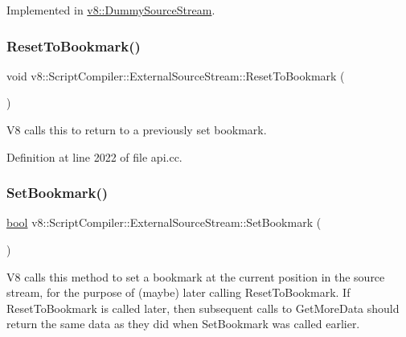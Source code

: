 Implemented in \mbox{\hyperlink{classv8_1_1DummySourceStream_a0b4b9e3f0d0747d169ba75e68fe596d7}{v8\+::\+Dummy\+Source\+Stream}}.

\mbox{\label{classv8_1_1ScriptCompiler_1_1ExternalSourceStream_af950fd00676e6bdb8642791f651b161a}} 
\subsubsection{\texorpdfstring{Reset\+To\+Bookmark()}{ResetToBookmark()}}
{\footnotesize\ttfamily void v8\+::\+Script\+Compiler\+::\+External\+Source\+Stream\+::\+Reset\+To\+Bookmark (\begin{DoxyParamCaption}{ }\end{DoxyParamCaption})\hspace{0.3cm}{\ttfamily [virtual]}}

V8 calls this to return to a previously set bookmark. 

Definition at line 2022 of file api.\+cc.

\mbox{\label{classv8_1_1ScriptCompiler_1_1ExternalSourceStream_a0012cebde92a3a61ec033e3abc2dd2ee}} 
\subsubsection{\texorpdfstring{Set\+Bookmark()}{SetBookmark()}}
{\footnotesize\ttfamily \mbox{\hyperlink{classbool}{bool}} v8\+::\+Script\+Compiler\+::\+External\+Source\+Stream\+::\+Set\+Bookmark (\begin{DoxyParamCaption}{ }\end{DoxyParamCaption})\hspace{0.3cm}{\ttfamily [virtual]}}

V8 calls this method to set a \textquotesingle{}bookmark\textquotesingle{} at the current position in the source stream, for the purpose of (maybe) later calling Reset\+To\+Bookmark. If Reset\+To\+Bookmark is called later, then subsequent calls to Get\+More\+Data should return the same data as they did when Set\+Bookmark was called earlier.

